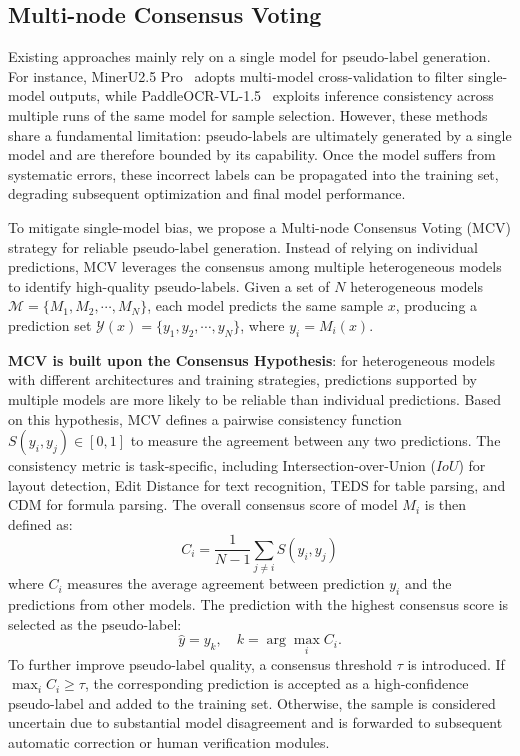 \documentclass{fairmeta}
\begin{document}
\subsection{Multi-node Consensus Voting}
Existing approaches mainly rely on a single model for pseudo-label generation. For instance, MinerU2.5 Pro~\cite{wang2026mineru2} adopts multi-model cross-validation to filter single-model outputs, while PaddleOCR-VL-1.5~\cite{paddleocr_vl15} exploits inference consistency across multiple runs of the same model for sample selection. However, these methods share a fundamental limitation: pseudo-labels are ultimately generated by a single model and are therefore bounded by its capability. Once the model suffers from systematic errors, these incorrect labels can be propagated into the training set, degrading subsequent optimization and final model performance.

To mitigate single-model bias, we propose a Multi-node Consensus Voting (MCV) strategy for reliable pseudo-label generation. Instead of relying on individual predictions, MCV leverages the consensus among multiple heterogeneous models to identify high-quality pseudo-labels. Given a set of $N$ heterogeneous models $\mathcal{M}=\{M_1,M_2,\cdots,M_N\}$, each model predicts the same sample $x$, producing a prediction set $\mathcal{Y}(x)=\{y_1,y_2,\cdots,y_N\}$, where $y_i=M_i(x)$.

\textbf{MCV is built upon the Consensus Hypothesis}: for heterogeneous models with different architectures and training strategies, predictions supported by multiple models are more likely to be reliable than individual predictions. Based on this hypothesis, MCV defines a pairwise consistency function $S(y_i,y_j)\in[0,1]$ to measure the agreement between any two predictions. The consistency metric is task-specific, including Intersection-over-Union ($IoU$) for layout detection, Edit Distance for text recognition, TEDS for table parsing, and CDM for formula parsing. The overall consensus score of model $M_i$ is then defined as:
\begin{equation}
 C_i=\frac{1}{N-1}\sum_{j\neq i}S(y_i,y_j)
\end{equation}
where $C_i$ measures the average agreement between prediction $y_i$ and the predictions from other models. The prediction with the highest consensus score is selected as the pseudo-label:
\begin{equation}
\hat{y}=y_{k},\quad k=\arg\max_i C_i .
\end{equation}
To further improve pseudo-label quality, a consensus threshold $\tau$ is introduced. If $\max_i C_i\geq\tau$, the corresponding prediction is accepted as a high-confidence pseudo-label and added to the training set. Otherwise, the sample is considered uncertain due to substantial model disagreement and is forwarded to subsequent automatic correction or human verification modules.
\end{document}

